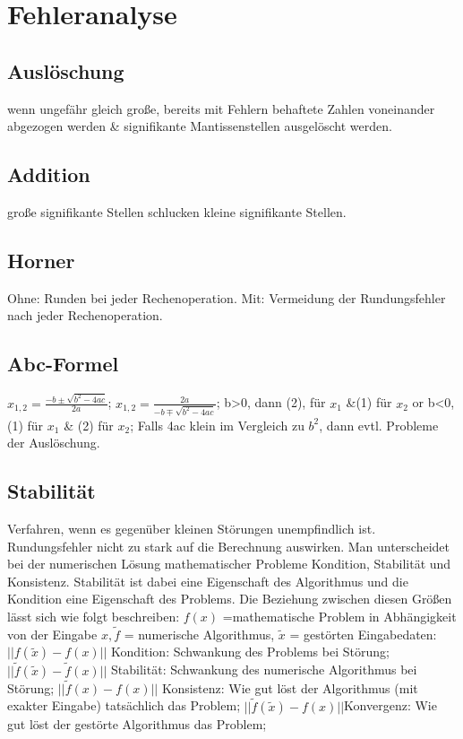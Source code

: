 \section{Fehleranalyse}
\subsection{Auslöschung}
wenn ungefähr gleich große, bereits mit Fehlern behaftete Zahlen voneinander abgezogen werden \& signifikante Mantissenstellen ausgelöscht werden.
\subsection{Addition}
große signifikante Stellen schlucken kleine signifikante Stellen.
\subsection{Horner}
Ohne: Runden bei jeder Rechenoperation. Mit: Vermeidung der Rundungsfehler nach jeder Rechenoperation.
\subsection{Abc-Formel}
$ x_{1,2} = \frac{-b \pm \sqrt{b^2 - 4ac}}{2a} $; 
$ x_{1,2} = \frac{2a}{-b \mp \sqrt{b^2 -4ac}} $; 
b>0, dann (2), für $ x_1 $ \&(1) für $ x_2 $ or 
b<0, (1) für $x_{1} $ \& (2) für $ x_2 $;
Falls 4ac klein im Vergleich zu $ b^2$, dann evtl. Probleme der Auslöschung.
\subsection{Stabilität}
Verfahren, wenn es gegenüber kleinen Störungen unempfindlich ist. Rundungsfehler nicht zu stark auf die Berechnung auswirken. Man unterscheidet bei der numerischen Lösung mathematischer Probleme Kondition, Stabilität und Konsistenz. Stabilität ist dabei eine Eigenschaft des Algorithmus und die Kondition eine Eigenschaft des Problems. Die Beziehung zwischen diesen Größen lässt sich wie folgt beschreiben:
$f(x) $ =mathematische Problem in Abhängigkeit von der Eingabe $ x, \tilde{f}$ = numerische Algorithmus, 
$ \tilde{x} $ = gestörten Eingabedaten:
$ || f(\tilde{x}) - f(x) || $ Kondition: Schwankung des Problems bei Störung; 
$ ||\tilde{f}( \tilde{x} ) - \tilde{f} (x) || $ Stabilität: Schwankung des numerische Algorithmus bei Störung; 
$ ||\tilde{f}(x)-f(x) || $ Konsistenz: Wie gut löst der Algorithmus (mit exakter Eingabe) tatsächlich das Problem; 
$ || \tilde{f}( \tilde{x} )-f(x)|| $Konvergenz: Wie gut löst der gestörte Algorithmus das Problem; 
